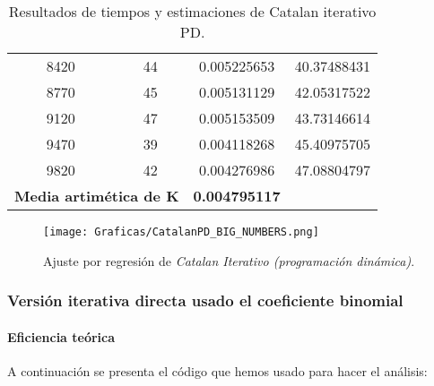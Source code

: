 \documentclass[a4paper,12pt]{article} %
\begin{document}
\begin{table}[H]
{\begin{tabular}{|c|c|c|c|}
			8420                                               & 44                   & 0.005225653              & 40.37488431                                          \\
			8770                                               & 45                   & 0.005131129              & 42.05317522                                          \\
			9120                                               & 47                   & 0.005153509              & 43.73146614                                          \\
			9470                                               & 39                   & 0.004118268              & 45.40975705                                          \\
			9820                                               & 42                   & 0.004276986              & 47.08804797                                          \\
			\hline
			\multicolumn{2}{l}{\textbf{Media artimética de K}} & \textbf{0.004795117}                                                                                   \\
			\hline
		\end{tabular}
	}
	\caption{Resultados de tiempos y estimaciones de Catalan iterativo PD.}
	\label{tab:tiempos}
\end{table}

\begin{figure}[H]
	\centering
	\texttt{[image: Graficas/CatalanPD\_BIG\_NUMBERS.png]}
	\caption{Ajuste por regresión de \textit{Catalan Iterativo (programación dinámica)}.}
\end{figure}

\subsubsection{Versión iterativa directa usado el coeficiente binomial}

\paragraph{Eficiencia teórica}

A continuación se presenta el código que hemos usado para hacer el análisis:
\end{document}
